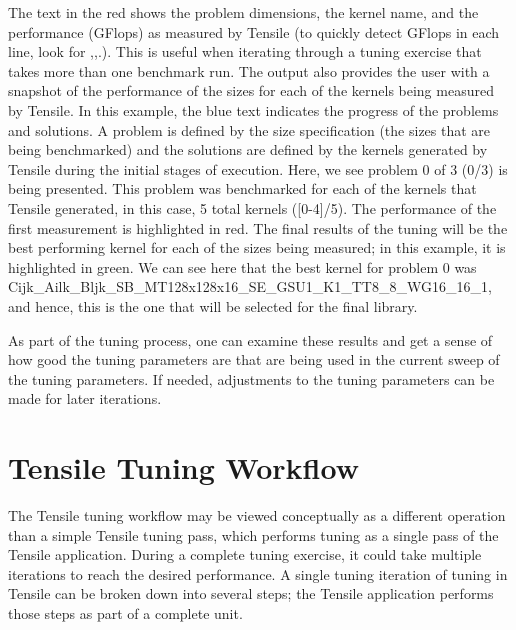 \documentclass[]{article}
\begin{document}
\noindent
The text in the red shows the problem dimensions, the kernel name, and the performance (GFlops) as measured by Tensile (to quickly detect GFlops in each line, look for ,,.). This is useful when iterating through a tuning exercise that takes more than one benchmark run. The output also provides the user with a snapshot of the performance of the sizes for each of the kernels being measured by Tensile. In this example, the blue text indicates the progress of the problems and solutions. A problem is defined by the size specification (the sizes that are being benchmarked) and the solutions are defined by the kernels generated by Tensile during the initial stages of execution. Here, we see problem 0 of 3 (0/3) is being presented. This problem was benchmarked for each of the kernels that Tensile generated, in this case, 5 total kernels ([0-4]/5). The performance of the first measurement is highlighted in red. The final results of the tuning will be the best performing kernel for each of the sizes being measured; in this example, it is highlighted in green. We can see here that the best kernel for problem 0 was Cijk\_Ailk\_Bljk\_SB\_MT128x128x16\_SE\_GSU1\_K1\_TT8\_8\_WG16\_16\_1, and hence, this is the one that will be selected for the final library.

As part of the tuning process, one can examine these results and get a sense of how good the tuning parameters are that are being used in the current sweep of the tuning parameters. If needed, adjustments to the tuning parameters can be made for later iterations.

\section{Tensile Tuning Workflow}

The Tensile tuning workflow may be viewed conceptually as a different operation than a simple Tensile tuning pass, which performs tuning as a single pass of the Tensile application. During a complete tuning exercise, it could take multiple iterations to reach the desired performance. A single tuning iteration of tuning in Tensile can be broken down into several steps; the Tensile application performs those steps as part of a complete unit.
\end{document}
